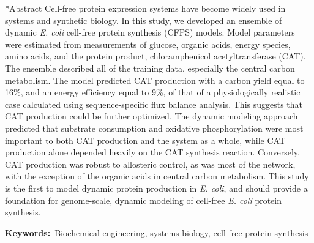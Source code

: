 \documentclass[12pt]{article}
\makeatletter
\renewcommand\section{\@startsection
	{subsection}{2}{0mm}
	{-0.2in}
	{0.05\baselineskip}
	{\normalfont\large\bfseries}}
\makeatother
\begin{document}
\section*{Abstract}
Cell-free protein expression systems have become widely used in systems and synthetic biology.
In this study, we developed an ensemble of dynamic \textit{E. coli} cell-free protein synthesis (CFPS) models.
Model parameters were estimated from measurements of glucose, organic acids, energy species, amino acids, and the protein product, chloramphenicol acetyltransferase (CAT).
The ensemble described all of the training data, especially the central carbon metabolism.
The model predicted CAT production with a carbon yield equal to 16\%, and an energy efficiency equal to 9\%, of that of a physiologically realistic case calculated using sequence-specific flux balance analysis.
This suggests that CAT production could be further optimized.
The dynamic modeling approach predicted that substrate consumption and oxidative phosphorylation were most important to both CAT production and the system as a whole, while CAT production alone depended heavily on the CAT synthesis reaction.
Conversely, CAT production was robust to allosteric control, as was most of the network, with the exception of the organic acids in central carbon metabolism.
This study is the first to model dynamic protein production in \textit{E. coli}, and should provide a foundation for genome-scale,
dynamic modeling of cell-free \textit{E. coli} protein synthesis.

\vspace{0.1in}
{\noindent \textbf{Keywords:}~Biochemical engineering, systems biology, cell-free protein synthesis}

\pagebreak

\setcounter{page}{1}


\linenumbers
\end{document}
